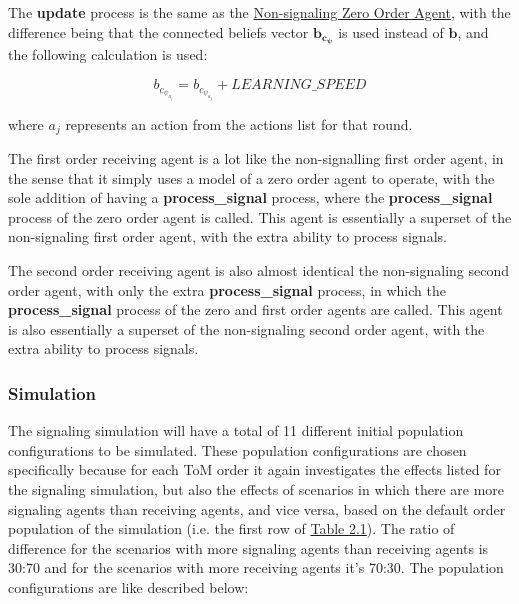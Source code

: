 The \textbf{update} process is the same as the \hyperref[eq:zero-order-update]{Non-signaling Zero Order Agent}, with the difference being that the connected beliefs vector $\mathbf{b_{c_\psi}}$ is used instead of $\mathbf{b}$, and the following calculation is used:

\begin{equation*}
    b_{c_{\psi_{a_j}}} = b_{c_{\psi_{a_j}}} + LEARNING\_SPEED
\end{equation*}

where $a_j$ represents an action from the actions list for that round.


The first order receiving agent is a lot like the non-signalling first order agent, in the sense that it simply uses a model of a zero order agent to operate, with the sole addition of having a \textbf{process\_signal} process, where the \textbf{process\_signal} process of the zero order agent is called. This agent is essentially a superset of the non-signaling first order agent, with the extra ability to process signals.


The second order receiving agent is also almost identical the non-signaling second order agent, with only the extra \textbf{process\_signal} process, in which the \textbf{process\_signal} process of the zero and first order agents are called. This agent is also essentially a superset of the non-signaling second order agent, with the extra ability to process signals.

\subsubsection{Simulation}

The signaling simulation will have a total of 11 different initial population configurations to be simulated. These population configurations are chosen specifically because for each ToM order it again investigates the effects listed for the signaling simulation, but also the effects of scenarios in which there are more signaling agents than receiving agents, and vice versa, based on the default order population of the simulation (i.e. the first row of \hyperref[tab:reg-population-table]{Table 2.1}). The ratio of difference for the scenarios with more signaling agents than receiving agents is 30:70 and for the scenarios with more receiving agents it's 70:30. The population configurations are like described below:

